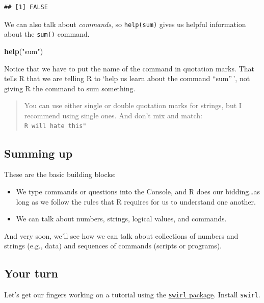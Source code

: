 \documentclass[]{article}
\newenvironment{Shaded}{\begin{snugshade}}{\end{snugshade}}
\newcommand{\KeywordTok}[1]{\textcolor[rgb]{0.13,0.29,0.53}{\textbf{#1}}}
\newcommand{\StringTok}[1]{\textcolor[rgb]{0.31,0.60,0.02}{#1}}
\newcommand{\NormalTok}[1]{#1}
\providecommand{\tightlist}{%
  \setlength{\itemsep}{0pt}\setlength{\parskip}{0pt}}
\begin{document}
\begin{verbatim}
## [1] FALSE
\end{verbatim}

We can also talk about \emph{commands}, so
\texttt{help(\textquotesingle{}sum\textquotesingle{})} gives us helpful
information about the \texttt{sum()} command.

\begin{Shaded}
\begin{Highlighting}[]
\KeywordTok{help}\NormalTok{(}\StringTok{"sum"}\NormalTok{)}
\end{Highlighting}
\end{Shaded}

Notice that we have to put the name of the command in quotation marks.
That tells R that we are telling R to `help us learn about the command
``sum''\,', not giving R the command to sum something.

\begin{quote}
You can use either single or double quotation marks for strings, but I
recommend using single ones. And don't mix and match:
\texttt{\textquotesingle{}R\ will\ hate\ this"}
\end{quote}

\subsection{Summing up}\label{summing-up}

These are the basic building blocks:

\begin{itemize}
\tightlist
\item
  We type commands or questions into the Console, and R does our
  bidding\ldots{}as long as we follow the rules that R requires for us
  to understand one another.
\item
  We can talk about numbers, strings, logical values, and commands.
\end{itemize}

And very soon, we'll see how we can talk about collections of numbers
and strings (e.g., data) and sequences of commands (scripts or
programs).

\subsection{Your turn}\label{your-turn}

Let's get our fingers working on a tutorial using the
\href{https://swirlstats.com/}{\texttt{swirl} package}. Install
\texttt{swirl}.
\end{document}
